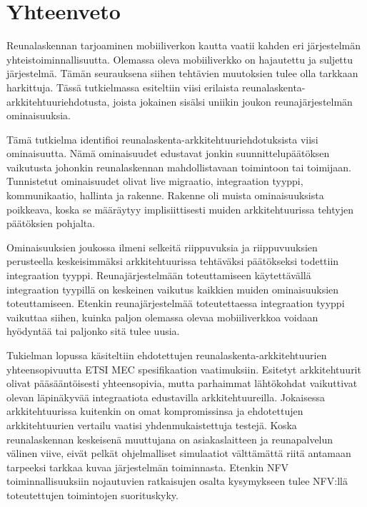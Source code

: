 \section{Yhteenveto} \label{yhteenveto}
Reunalaskennan tarjoaminen mobiiliverkon kautta vaatii kahden eri järjestelmän yhteistoiminnallisuutta.
Olemassa oleva mobiiliverkko on hajautettu ja suljettu järjestelmä.
Tämän seurauksena siihen tehtävien muutoksien tulee olla tarkkaan harkittuja.
Tässä tutkielmassa esiteltiin viisi erilaista reunalaskenta-arkkitehtuuriehdotusta, joista jokainen sisälsi uniikin joukon reunajärjestelmän ominaisuuksia.

Tämä tutkielma identifioi reunalaskenta-arkkitehtuuriehdotuksista viisi ominaisuutta.
Nämä ominaisuudet edustavat jonkin suunnittelupäätöksen vaikutusta johonkin reunalaskennan mahdollistavaan toimintoon tai toimijaan.
Tunnistetut ominaisuudet olivat live migraatio, integraation tyyppi, kommunikaatio, hallinta ja rakenne.
Rakenne oli muista ominaisuuksista poikkeava, koska se määräytyy implisiittisesti muiden arkkitehtuurissa tehtyjen päätöksien pohjalta.

Ominaisuuksien joukossa ilmeni selkeitä riippuvuksia ja riippuvuuksien perusteella keskeisimmäksi arkkitehtuurissa tehtäväksi päätökseksi todettiin integraation tyyppi.
Reunajärjestelmään toteuttamiseen käytettävällä integraation tyypillä on keskeinen vaikutus kaikkien muiden ominaisuuksien toteuttamiseen.
Etenkin reunajärjestelmää toteutettaessa integraation tyyppi vaikuttaa siihen, kuinka paljon olemassa olevaa mobiiliverkkoa voidaan hyödyntää tai paljonko sitä tulee uusia. 

Tukielman lopussa käsiteltiin ehdotettujen reunalaskenta-arkkitehtuurien yhteensopivuutta ETSI MEC spesifikaation vaatimuksiin.
Esitetyt arkkitehtuurit olivat pääsääntöisesti yhteensopivia, mutta parhaimmat lähtökohdat vaikuttivat olevan läpinäkyvää integraatiota edustavilla arkkitehtuureilla.
Jokaisessa arkkitehtuurissa kuitenkin on omat kompromissinsa ja ehdotettujen arkkitehtuurien vertailu vaatisi yhdenmukaistettuja testejä. 
Koska reunalaskennan keskeisenä muuttujana on asiakaslaitteen ja reunapalvelun välinen viive, eivät pelkät ohjelmalliset simulaatiot välttämättä riitä antamaan tarpeeksi tarkkaa kuvaa järjestelmän toiminnasta.
Etenkin NFV toiminnallisuuksiin nojautuvien ratkaisujen osalta kysymykseen tulee NFV:llä toteutettujen toimintojen suorituskyky.

%



